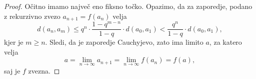 \documentclass[12pt, a4paper]{article}
\begin{document}
\begin{proof}
Očitno imamo največ eno fiksno točko. Opazimo, da za zaporedje, podano z rekurzivno zvezo $a_{n+1}=f(a_n)$ velja
\[
d(a_n,a_m)\leq q^n\cdot\frac{1-q^{m-n}}{1-q}\cdot d(a_0,a_1)<\frac{q^n}{1-q}\cdot d(a_0,a_1),
\]
kjer je $m\geq n$. Sledi, da je zaporedje Cauchyjevo, zato ima limito $a$, za katero velja
\[
a=\lim_{n\to\infty}a_{n+1}=\lim_{n\to\infty}f(a_n)=f(a),
\]
saj je $f$ zvezna.
\end{proof}

\newpage
\printindex
\end{document}
